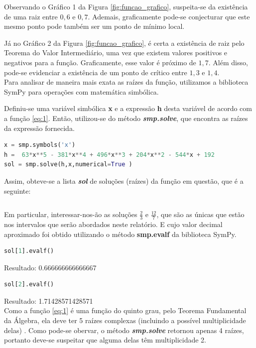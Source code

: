 \documentclass{article}
\begin{document}
Observando o Gr\'{a}fico 1 da Figura \ref{fig:funcao_grafico}, suspeita-se da existência de uma raiz entre $0,6$ e $0,7$. Ademais, graficamente pode-se conjecturar que este mesmo ponto pode também ser um ponto de mínimo local.

Já no Gráfico 2 da Figura \ref{fig:funcao_grafico}, é certa a existência de raiz pelo Teorema do Valor Intermediário, uma vez que existem valores positivos e negativos para a função. Graficamente, esse valor é próximo de $1,7$. Além disso, pode-se evidenciar a existência de um ponto de crítico entre $1,3$ e $1,4$.
\\


Para analisar de maneira mais exata as ra\'{i}zes da fun\c{c}\~{a}o, utilizamos a biblioteca SymPy \cite{sympy} para operações com matemática simbólica.

Definiu-se uma variável simbólica \textbf{x} e a expressão \textbf{h} desta variável de acordo com a função \eqref{eq:1}. Então, utilizou-se do método \textit{\textbf{smp.solve}}, que encontra as raízes da expressão fornecida.
  
\begin{lstlisting}[language=Python]
x = smp.symbols('x') 
h =  63*x**5 - 381*x**4 + 496*x**3 + 204*x**2 - 544*x + 192
sol = smp.solve(h,x,numerical=True )
\end{lstlisting}




Assim, obteve-se a lista \textbf{\textit{sol}} de soluções (raízes) da função em questão, que é a seguinte:

\begin{equation}
[-1, \frac{2}{3}, \frac{12}{7}, 4]
\label{eq:sol}
\end{equation}

Em particular, interessar-nos-ão as soluções $\frac{2}{3}$ e $\frac{12}{7}$, que são as únicas que estão nos intervalos que serão abordados neste relatório. E cujo valor decimal aproximado foi obtido utilizando o método \textbf{smp.evalf} da biblioteca SymPy.
\begin{lstlisting}[language=Python]
    sol[1].evalf()
\end{lstlisting}
Resultado:
0.666666666666667
\begin{lstlisting}[language=Python]
    sol[2].evalf()
\end{lstlisting}
Resultado:
1.71428571428571\\

Como a função \eqref{eq:1} é uma função do quinto grau, pelo Teorema Fundamental da Álgebra, ela deve ter 5 raízes complexas (incluindo a possível multiplicidade delas) \cite{wikipedia}. Como pode-se obervar, o método \textbf{\textit{smp.solve}} retornou apenas 4 raízes, portanto deve-se suspeitar que alguma delas têm multiplicidade 2. 
\end{document}
